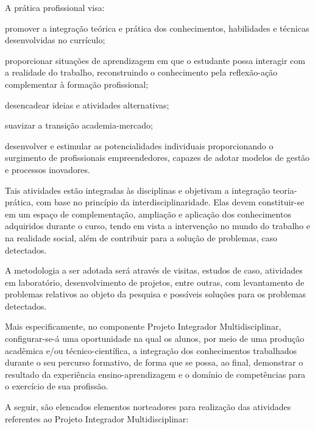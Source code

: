 \documentclass[
	12pt,				%
	openright,			%
	twoside,			%
	a4paper,			%
	chapter=TITLE,		%
	english,			%
	french,				%
	spanish,			%
	brazil,				%
	]{abntex2}
\begin{document}
A prática profissional visa:
\begin{alineas}
	\item promover a integração teórica e prática dos conhecimentos, habilidades e
técnicas desenvolvidas no currículo;
	\item proporcionar situações de aprendizagem em que o estudante possa
interagir com a realidade do trabalho, reconstruindo o conhecimento pela
reflexão-ação complementar à formação profissional;
	\item desencadear ideias e atividades alternativas;
	\item suavizar a transição academia-mercado;
	\item desenvolver e estimular as potencialidades individuais proporcionando o
surgimento de profissionais empreendedores, capazes de adotar modelos
de gestão e processos inovadores. 
	 	
\end{alineas}

Tais atividades estão integradas às disciplinas e objetivam a integração teoria-
prática, com base no princípio da interdisciplinaridade. Elas devem constituir-se em
um espaço de complementação, ampliação e aplicação dos conhecimentos adquiridos
durante o curso, tendo em vista a intervenção no mundo do trabalho e na realidade
social, além de contribuir para a solução de problemas, caso detectados.


A metodologia a ser adotada será através de visitas, estudos de caso,
atividades em laboratório, desenvolvimento de projetos, entre outras, com
levantamento de problemas relativos ao objeto da pesquisa e possíveis soluções para
os problemas detectados.

Mais especificamente, no componente  Projeto Integrador Multidisciplinar, configurar-se-á uma oportunidade na qual os alunos, por meio de uma produção acadêmica e/ou técnico-científica, a integração dos conhecimentos trabalhados durante o seu percurso formativo, de forma que se possa, ao final, demonstrar o resultado da experiência ensino-aprendizagem e o domínio de competências para o exercício de sua profissão.

A seguir, são elencados elementos norteadores para realização das atividades referentes ao Projeto Integrador Multidisciplinar:
\end{document}
